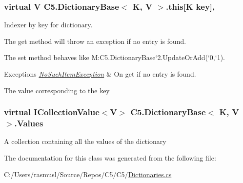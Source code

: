 \hypertarget{class_c5_1_1_dictionary_base_aca2fd266c08a8668a6f1e5b85aa43d6b}{}
\subsubsection[{this[K key]}]{\setlength{\rightskip}{0pt plus 5cm}virtual V {\bf C5.\+Dictionary\+Base}$<$ K, V $>$.this\mbox{[}K key\mbox{]}\hspace{0.3cm}{\ttfamily [get]}, {\ttfamily [set]}}\label{class_c5_1_1_dictionary_base_aca2fd266c08a8668a6f1e5b85aa43d6b}


Indexer by key for dictionary. 

The get method will throw an exception if no entry is found. 

The set method behaves like M\+:\+C5.\+Dictionary\+Base`2.\+Update\+Or\+Add(`0,`1).


\begin{DoxyExceptions}{Exceptions}
{\em \hyperlink{class_c5_1_1_no_such_item_exception}{No\+Such\+Item\+Exception}} & On get if no entry is found. \\
\hline
\end{DoxyExceptions}


The value corresponding to the key\hypertarget{class_c5_1_1_dictionary_base_adf392009742ab67a355c66cf423f5fe6}{}
\subsubsection[{Values}]{\setlength{\rightskip}{0pt plus 5cm}virtual {\bf I\+Collection\+Value}$<$V$>$ {\bf C5.\+Dictionary\+Base}$<$ K, V $>$.Values\hspace{0.3cm}{\ttfamily [get]}}\label{class_c5_1_1_dictionary_base_adf392009742ab67a355c66cf423f5fe6}




A collection containing all the values of the dictionary

The documentation for this class was generated from the following file\+:\begin{DoxyCompactItemize}
\item 
C\+:/\+Users/rasmusl/\+Source/\+Repos/\+C5/\+C5/\hyperlink{_dictionaries_8cs}{Dictionaries.\+cs}\end{DoxyCompactItemize}
